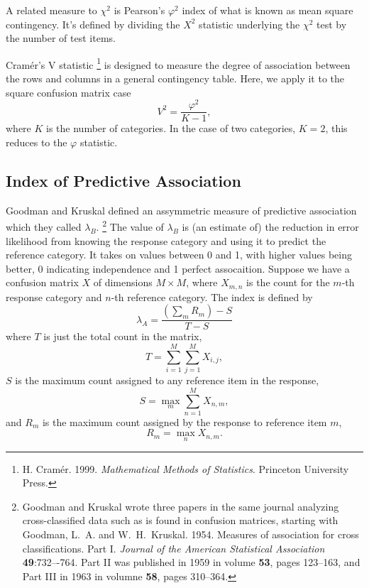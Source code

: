 A related measure to $\chi^2$ is Pearson's $\varphi^2$ index of what
is known as mean square contingency.  It's defined by dividing the
$X^2$ statistic underlying the $\chi^2$ test by the number of test
items. 

Cram\'er's V statistic%
%
\footnote{H. Cramér. 1999. {\it Mathematical Methods of
    Statistics}. Princeton University Press.}
%
is designed to measure the degree of association between the
rows and columns in a general contingency table.  Here, we apply
it to the square confusion matrix case
%
\begin{equation}
V^2 = \frac{\varphi^2}{K-1},
\end{equation}
%
where $K$ is the number of categories.   In the case of two categories,
$K=2$, this reduces to the $\varphi$ statistic.


\subsection{Index of Predictive Association}

Goodman and Kruskal defined an assymmetric measure of predictive
association which they called $\lambda_B$.%
%
\footnote{Goodman and Kruskal wrote three papers in the same journal analyzing
  cross-classified data such as is found in confusion matrices,
  starting with Goodman, L.~A. and W.~H.~Kruskal. 1954. Measures of
  association for cross classifications. Part I. {\it Journal of the
    American Statistical Association} {\bf 49}:732–-764.  Part II
was published in 1959 in volume {\bf 53}, pages 123--163, and
Part III in 1963 in volumne {\bf 58}, pages 310--364.}
%
The value of $\lambda_B$ is (an estimate of) the reduction in error
likelihood from knowing the response category and using it to predict
the reference category.  It takes on values between 0 and 1, with
higher values being better, 0 indicating independence and 1 perfect
assocaition.  Suppose we have a confusion matrix $X$ of dimensions $M
\times M$, where $X_{m,n}$ is the count for the $m$-th response
category and $n$-th reference category.  The index is defined by
%
\begin{equation}
\lambda_A 
= \frac{\left(\sum_m R_m\right) - S}
       {T - S}
\end{equation}
%
where $T$ is just the total count in the matrix,
%
\begin{equation}
T = \sum_{i = 1}^M \sum_{j=1}^M X_{i,j},
\end{equation}
%
$S$ is the maximum count assigned to any reference item in the
response,
%
\begin{equation}
S = \max_m \sum_{n=1}^M X_{n,m},
\end{equation}
%
and $R_m$ is the maximum count assigned by the response to reference
item $m$,
%
\begin{equation}
R_m = \max_n X_{n,m}.
\end{equation}
%

